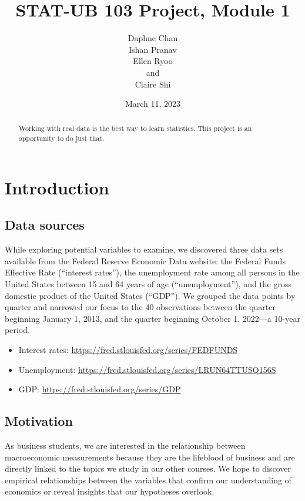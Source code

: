 \documentclass[12pt]{article}
\begin{document}
\def\spacingset#1{\renewcommand{\baselinestretch}
{#1}\small\normalsize} \spacingset{1}
\title{\bf STAT-UB 103 Project, Module 1}
\author{Daphne Chan\\
Ishan Pranav\\
Ellen Ryoo\\
and\\
Claire Shi}
\date{March 11, 2023}
\maketitle
\bigskip
\begin{abstract}
Working with real data is the best way to learn statistics. This project is an opportunity to do just that.
\end{abstract}
\newpage
\spacingset{1.08}
\section{Introduction}
\subsection{Data sources}
While exploring potential variables to examine, we discovered three data sets available from the Federal Reserve Economic Data website: the Federal Funds Effective Rate (``interest rates''), the unemployment rate among all persons in the United States between 15 and 64 years of age (``unemployment''), and the gross domestic product of the United States (``GDP''). We grouped the data points by quarter and narrowed our focus to the 40 observations between the quarter beginning January 1, 2013, and the quarter beginning October 1, 2022---a 10-year period. 
\begin{itemize}
\item Interest rates: \url{https://fred.stlouisfed.org/series/FEDFUNDS}
\item Unemployment: \url{https://fred.stlouisfed.org/series/LRUN64TTUSQ156S}
\item GDP: \url{https://fred.stlouisfed.org/series/GDP}
\end{itemize}
\subsection{Motivation}
As business students, we are interested in the relationship between macroeconomic measurements because they are the lifeblood of business and are directly linked to the topics we study in our other courses. We hope to discover empirical relationships between the variables that confirm our understanding of economics or reveal insights that our hypotheses overlook. 
\end{document}
